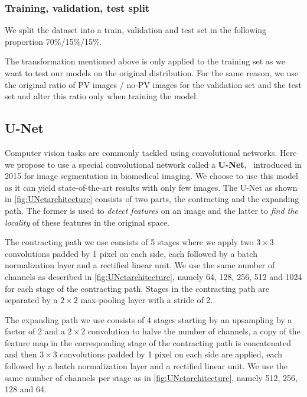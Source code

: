\documentclass[10pt,conference]{IEEEtran}
\begin{document}
\subsubsection{Training, validation, test split}
We split the dataset into a train, validation and test set in the following proportion 70\%/15\%/15\%.

The transformation mentioned above is only applied to the training set as we want to test our models on the original distribution. For the same reason, we use the original ratio of PV images / no-PV images for the validation set and the test set and alter this ratio only when training the model.

\subsection{U-Net}
Computer vision tasks are commonly tackled using convolutional networks. 
Here we propose to use a special convolutional network called a \textbf{U-Net},~\cite{ronneberger2015unet}
introduced in 2015 for image segmentation in biomedical imaging.
We choose to use this model as it can yield state-of-the-art results with only few images.
The U-Net as shown in \autoref{fig:UNetarchitecture} consists of two parts,
the contracting and the expanding path.
The former is used to \textit{detect features} on an image
and the latter to \textit{find the locality} of these features in the original space.

The contracting path we use consists of 5 stages where we apply two $3 \times 3$ convolutions padded by 1 pixel on each side,
each followed by a batch normalization layer and a rectified linear unit.
We use the same number of channels as described in \autoref{fig:UNetarchitecture}, namely 64, 128, 256, 512 and 1024 for each stage of the contracting path. 
Stages in the contracting path are separated by a $2 \times 2$ max-pooling layer with a stride of 2. 

The expanding path we use consists of 4 stages starting by an upsampling by a factor of 2 and a $2 \times 2$ convolution to halve the number of channels,
a copy of the feature map in the corresponding stage of the contracting path is concatenated and then $3 \times 3$ convolutions padded by 1 pixel on each side are applied,
each followed by a batch normalization layer and a rectified linear unit.
We use the same number of channels per stage as in \autoref{fig:UNetarchitecture}, namely 512, 256, 128 and 64.
\end{document}
